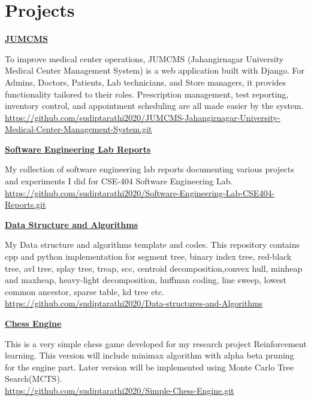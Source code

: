 \documentclass[a4paper,10pt]{article}
\begin{document}
\section*{Projects}
\href{https://github.com/sudiptarathi2020/JUMCMS-Jahangirnagar-University-Medical-Center-Management-System.git}{\textbf{JUMCMS}}
\begin{boxB}
    To improve medical center operations, JUMCMS (Jahangirnagar University Medical Center Management System) is a web application built with Django. For Admins, Doctors, Patients, Lab technicians, and Store managers, it provides functionality tailored to their roles. Prescription management, test reporting, inventory control, and appointment scheduling are all made easier by the system.\\
    \href{https://github.com/sudiptarathi2020/JUMCMS-Jahangirnagar-University-Medical-Center-Management-System.git}{https://github.com/sudiptarathi2020/JUMCMS-Jahangirnagar-University-Medical-Center-Management-System.git}
\end{boxB}

\href{https://github.com/sudiptarathi2020/Software-Engineering-Lab-CSE404-Reports.git}{\textbf{Software Engineering Lab Reports}}
\begin{boxB}
    My collection of software engineering lab reports documenting various projects and experiments I did for CSE-404 Software Engineering Lab.\\
    \href{https://github.com/sudiptarathi2020/Software-Engineering-Lab-CSE404-Reports.git}{https://github.com/sudiptarathi2020/Software-Engineering-Lab-CSE404-Reports.git}
\end{boxB}

\href{https://github.com/sudiptarathi2020/Data-structures-and-Algorithms}{\textbf{Data Structure and Algorithms}}
\begin{boxB}
    My Data structure and algorithms template and codes. This repository contains cpp and python implementation for segment tree, binary index tree, red-black tree, avl tree, splay tree, treap, scc, centroid decomposition,convex hull, minheap and maxheap, heavy-light decomposition, huffman coding, line sweep, lowest common ancestor, sparse table, kd tree etc.\\ \href{https://github.com/sudiptarathi2020/Data-structures-and-Algorithms}{https://github.com/sudiptarathi2020/Data-structures-and-Algorithms}
\end{boxB}

\href{https://github.com/sudiptarathi2020/Simple-Chess-Engine.git}{\textbf{Chess Engine}}
\begin{boxB}
   This is a very simple chess game developed for my research project Reinforcement learning. This version will include minimax algorithm with alpha beta pruning for the engine part. Later version will be implemented using Monte Carlo Tree Search(MCTS).\\ \href{https://github.com/sudiptarathi2020/Simple-Chess-Engine.git}{https://github.com/sudiptarathi2020/Simple-Chess-Engine.git}
\end{boxB}
\end{document}
